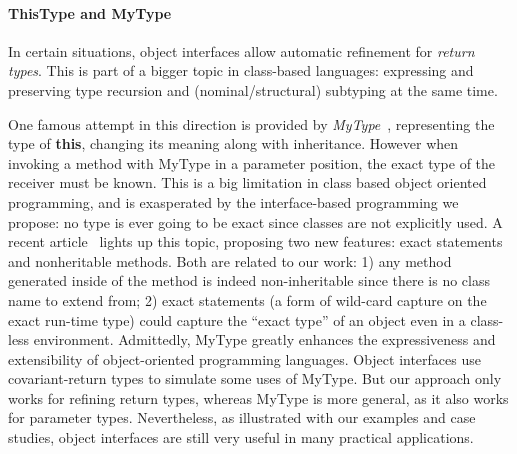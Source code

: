 % 

\paragraph{ThisType and MyType}
In certain situations, object interfaces allow automatic refinement for \emph{return
types}. This is part of a bigger topic in class-based languages: expressing and
preserving type recursion and (nominal/structural) subtyping at the same time.

One famous attempt in this direction is provided by
\emph{MyType}~\cite{bruce1994paradigmatic}, representing the type of
\textbf{this}, changing its meaning along with inheritance. However when
invoking a method with MyType in a parameter position, the exact type of the
receiver must be known.  This is a big limitation in class based object oriented
programming, and is exasperated by the interface-based programming we propose: no
type is ever going to be exact since classes are not explicitly used. A recent
article~\cite{Saito2013933} lights up this topic, proposing two
new features: exact statements and nonheritable methods. Both are
related to our work: 1) any method generated inside of the \Q@of@ method is indeed
non-inheritable since there is no class name to extend from; 2) exact
statements (a form of wild-card capture on the exact run-time type) could
capture the ``exact type'' of an object even in a class-less
environment.
Admittedly, MyType greatly enhances the expressiveness and extensibility of
object-oriented programming languages. Object interfaces use covariant-return types to
simulate some uses of MyType. But our approach only works for refining
return types, whereas MyType is more general, as it also works for
parameter types. Nevertheless, as illustrated with our examples and
case studies, object interfaces are still very useful in many
practical applications.


